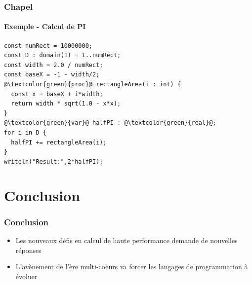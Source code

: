 \documentclass{beamer}
\begin{document}
\begin{frame}[fragile]
\frametitle{Chapel}
\framesubtitle{Exemple - Calcul de PI}
\begin{lstlisting}
const numRect = 10000000;
const D : domain(1) = 1..numRect;
const width = 2.0 / numRect;
const baseX = -1 - width/2;
@\textcolor{green}{proc}@ rectangleArea(i : int) {
  const x = baseX + i*width;
  return width * sqrt(1.0 - x*x);
}
@\textcolor{green}{var}@ halfPI : @\textcolor{green}{real}@;
for i in D {
  halfPI += rectangleArea(i);
}
writeln("Result:",2*halfPI);  
\end{lstlisting}
\end{frame}


\section{Conclusion}
\begin{frame}
\frametitle{Conclusion}
\begin{itemize}
\item Les nouveaux défis en calcul de haute performance demande de nouvelles réponses
\item<2-> L'avènement de l'ère multi-coeurs va forcer les langages de programmation à évoluer
\end{itemize}
\end{frame}
\end{document}
